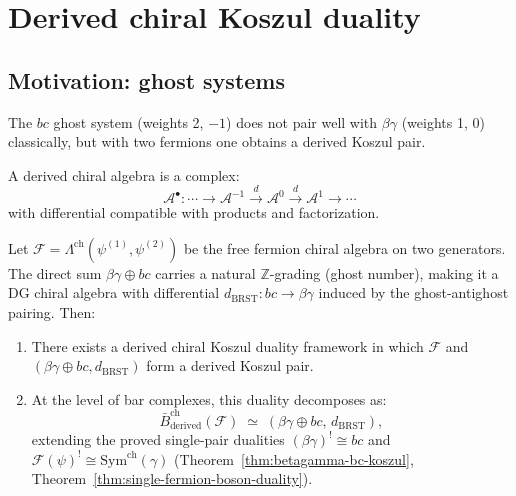 \section{Derived chiral Koszul duality}

\subsection{Motivation: ghost systems}

The $bc$ ghost system (weights 2, $-1$) does not pair well with $\beta\gamma$ (weights 1, 0) classically, but with two fermions one obtains a derived Koszul pair.

\begin{definition}
A derived chiral algebra is a complex:
\[\mathcal{A}^{\bullet}: \cdots \to \mathcal{A}^{-1} \xrightarrow{d} \mathcal{A}^0 \xrightarrow{d} \mathcal{A}^1 \to \cdots\]
with differential compatible with products and factorization.
\end{definition}

\begin{conjecture}\label{conj:derived-bc-betagamma}
Let $\mathcal{F} = \Lambda^{\mathrm{ch}}(\psi^{(1)}, \psi^{(2)})$ be the
free fermion chiral algebra on two generators.  The direct sum
$\beta\gamma \oplus bc$ carries a natural $\mathbb{Z}$-grading
(ghost number), making it a DG chiral algebra with differential
$d_{\mathrm{BRST}} \colon bc \to \beta\gamma$ induced by the
ghost-antighost pairing.  Then:
\begin{enumerate}
\item There exists a derived chiral Koszul duality framework in which
  $\mathcal{F}$ and $(\beta\gamma \oplus bc, d_{\mathrm{BRST}})$
  form a derived Koszul pair.
\item At the level of bar complexes, this duality decomposes as:
  \[
  \bar{B}^{\mathrm{ch}}_{\mathrm{derived}}(\mathcal{F})
  \;\simeq\;
  (\beta\gamma \oplus bc,\, d_{\mathrm{BRST}}),
  \]
  extending the proved single-pair dualities
  $(\beta\gamma)^! \cong bc$ and $\mathcal{F}(\psi)^! \cong
  \mathrm{Sym}^{\mathrm{ch}}(\gamma)$
  (Theorem~\ref{thm:betagamma-bc-koszul},
  Theorem~\ref{thm:single-fermion-boson-duality}).
\end{enumerate}
\end{conjecture}

